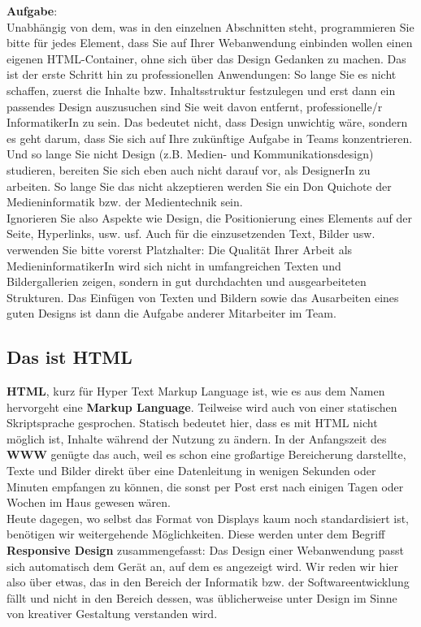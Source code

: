 \textbf{Aufgabe}:\\

Unabhängig von dem, was in den einzelnen Abschnitten steht, programmieren Sie bitte für jedes Element, dass Sie auf Ihrer Webanwendung einbinden wollen einen eigenen HTML-Container, ohne sich über das Design Gedanken zu machen. Das ist der erste Schritt hin zu professionellen Anwendungen: So lange Sie es nicht schaffen, zuerst die Inhalte bzw. Inhaltsstruktur festzulegen und erst dann ein passendes Design auszusuchen sind Sie weit davon entfernt, professionelle/r InformatikerIn zu sein. Das bedeutet nicht, dass Design unwichtig wäre, sondern es geht darum, dass Sie sich auf Ihre zukünftige Aufgabe in Teams konzentrieren. Und so lange Sie nicht Design (z.B. Medien- und Kommunikationsdesign) studieren, bereiten Sie sich eben auch nicht darauf vor, als DesignerIn zu arbeiten. So lange Sie das nicht akzeptieren werden Sie ein Don Quichote der Medieninformatik bzw. der Medientechnik sein.\\

Ignorieren Sie also Aspekte wie Design, die Positionierung eines Elements auf der Seite, Hyperlinks, usw. usf. Auch für die einzusetzenden Text, Bilder usw. verwenden Sie bitte vorerst Platzhalter: Die Qualität Ihrer Arbeit als MedieninformatikerIn wird sich nicht in umfangreichen Texten und Bildergallerien zeigen, sondern in gut durchdachten und ausgearbeiteten Strukturen. Das Einfügen von Texten und Bildern sowie das Ausarbeiten eines guten Designs ist dann die Aufgabe anderer Mitarbeiter im Team.

\subsection{Das ist HTML}

\textbf{HTML}, kurz für Hyper Text Markup Language ist, wie es aus dem Namen hervorgeht eine \textbf{Markup Language}. Teilweise wird auch von einer statischen Skriptsprache gesprochen. Statisch bedeutet hier, dass es mit HTML nicht möglich ist, Inhalte während der Nutzung zu ändern. In der Anfangszeit des \textbf{WWW} genügte das auch, weil es schon eine großartige Bereicherung darstellte, Texte und Bilder direkt über eine Datenleitung in wenigen Sekunden oder Minuten empfangen zu können, die sonst per Post erst nach einigen Tagen oder Wochen im Haus gewesen wären. \\

Heute dagegen, wo selbst das Format von Displays kaum noch standardisiert ist, benötigen wir weitergehende Möglichkeiten. Diese werden unter dem Begriff \textbf{Responsive Design} zusammengefasst: Das Design einer Webanwendung passt sich automatisch dem Gerät an, auf dem es angezeigt wird. Wir reden wir hier also über etwas, das in den Bereich der Informatik bzw. der Softwareentwicklung fällt und nicht in den Bereich dessen, was üblicherweise unter Design im Sinne von kreativer Gestaltung verstanden wird.\\

